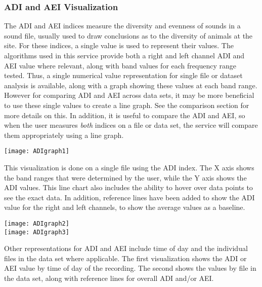 \subsubsection{ADI and AEI Visualization}
The ADI and AEI indices measure the diversity and evenness of sounds in a sound file, usually used to draw conclusions as to the diversity of animals at the site. For these indices, a single value is used to represent their values. The algorithms used in this service provide both a right and left channel ADI and AEI value where relevant, along with band values for each frequency range tested. Thus, a single numerical value representation for single file or dataset analysis is available, along with a graph showing these values at each band range. However for comparing ADI and AEI across data sets, it may be more beneficial to use these single values to create a line graph. See the comparison section for more details on this. In addition, it is useful to compare the ADI and AEI, so when the user measures \textit{both} indices on a file or data set, the service will compare them appropriately using a line graph.\\

\begin{center}
	\texttt{[image: ADIgraph1]} \\[12pt]
\end{center}
This visualization is done on a single file using the ADI index. The X axis shows the band ranges that were determined by the user, while the Y axis shows the ADI values. This line chart also includes the ability to hover over data points to see the exact data. In addition, reference lines have been added to show the ADI value for the right and left channels, to show the average values as a baseline.\\

\begin{center}
	\texttt{[image: ADIgraph2]} \\[12pt]
	\texttt{[image: ADIgraph3]} \\[12pt]
\end{center}
Other representations for ADI and AEI include time of day and the individual files in the data set where applicable. The first visualization shows the ADI or AEI value by time of day of the recording. The second shows the values by file in the data set, along with reference lines for overall ADI and/or AEI.

